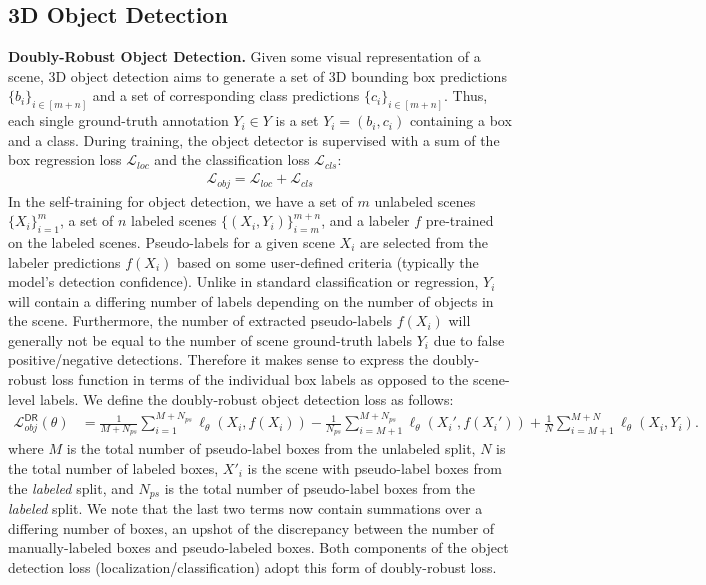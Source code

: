 \subsection{3D Object Detection}
\noindent \textbf{Doubly-Robust Object Detection.}
Given some visual representation of a scene, 3D object detection aims to generate a set of 3D bounding box predictions $\{b_i\}_{i\in[m+n]}$ and a set of corresponding class predictions $\{c_i\}_{i\in[m+n]}$. Thus, each single ground-truth annotation $Y_i \in Y$ is a set $Y_i = (b_i, c_i)$ containing a box and a class. During training, the object detector is supervised with a sum of the box regression loss $\mathcal{L}_{loc}$ and the classification loss $\mathcal{L}_{cls}$:
\begin{align*}
    \mathcal{L}_{obj} = \mathcal{L}_{loc} + \mathcal{L}_{cls}
\end{align*}
In the self-training  for object detection, we have a set of $m$ unlabeled scenes $\{X_i\}_{i=1}^m$, a set of $n$ labeled scenes $\{(X_i,Y_i)\}_{i=m}^{m+n}$, and a labeler $f$ pre-trained on the labeled scenes. Pseudo-labels for a given scene $X_i$ are selected from the labeler predictions $f(X_i)$ based on some user-defined criteria (typically the model's detection confidence). 
Unlike in standard classification or regression, $Y_i$ will contain a differing number of labels depending on the number of objects in the scene. Furthermore, the number of extracted pseudo-labels $f(X_i)$ will generally not be equal to the number of scene ground-truth labels $Y_i$ due to false positive/negative detections. Therefore it makes sense to express the doubly-robust loss function in terms of the individual box labels as opposed to the scene-level labels. We define the doubly-robust object detection loss as follows:
\begin{align*}
\mathcal{L}^{\mathsf{DR}}_{obj}(\theta) 
& = \frac{1}{M+N_{ps}}  \sum_{i=1}^{M+N_{ps}} \ell_\theta(X_i,  f(X_i)) -  \frac{1}{N_{ps}} \sum_{i=M+1}^{M+N_{ps}} \ell_\theta(X_i',  f(X_i'))  + \frac{1}{N} \sum_{i=M+1}^{M+N} \ell_\theta(X_i, Y_i). 
\end{align*}
where $M$ is the total number of pseudo-label boxes from the unlabeled split, $N$ is the total number of labeled boxes, $X'_i$ is the scene with pseudo-label boxes from the \textit{labeled} split, and $N_{ps}$ is the total number of pseudo-label boxes from the \textit{labeled} split. We note that the last two terms now contain summations over a differing number of boxes, an upshot of the discrepancy between the number of manually-labeled boxes and pseudo-labeled boxes. Both components of the object detection loss (localization/classification) adopt this form of  doubly-robust loss.


